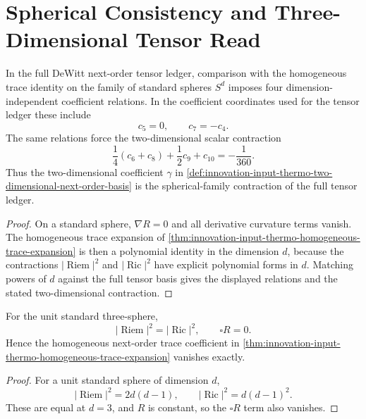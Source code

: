 \section{Spherical Consistency and Three-Dimensional Tensor Read}
\label{sec:innovation-input-thermo-verification-three-dimensional-tensor-coefficient}

\begin{theorem}
\label{thm:innovation-input-thermo-spherical-family-consistency}
In the full DeWitt next-order tensor ledger, comparison with the
homogeneous trace identity on the family of standard spheres $S^d$ imposes
four dimension-independent coefficient relations. In the coefficient
coordinates used for the tensor ledger these include
$$
c_5=0,
\qquad
c_7=-c_4.
$$
The same relations force the two-dimensional scalar contraction
$$
\frac14(c_6+c_8)+\frac12c_9+c_{10}
=
-\frac1{360}.
$$
Thus the two-dimensional coefficient $\gamma$ in
\autoref{def:innovation-input-thermo-two-dimensional-next-order-basis} is
the spherical-family contraction of the full tensor ledger.
\end{theorem}

\begin{proof}
On a standard sphere, $\nabla R=0$ and all derivative curvature terms vanish.
The homogeneous trace expansion of
\autoref{thm:innovation-input-thermo-homogeneous-trace-expansion} is then
a polynomial identity in the dimension $d$, because the contractions
$|\operatorname{Riem}|^2$ and $|\operatorname{Ric}|^2$ have explicit
polynomial forms in $d$. Matching powers of $d$ against the full tensor
basis gives the displayed relations and the stated two-dimensional
contraction.
\end{proof}

\begin{theorem}
\label{thm:innovation-input-thermo-three-sphere-zero-channel}
For the unit standard three-sphere,
$$
|\operatorname{Riem}|^2=|\operatorname{Ric}|^2,
\qquad
\square R=0.
$$
Hence the homogeneous next-order trace coefficient in
\autoref{thm:innovation-input-thermo-homogeneous-trace-expansion}
vanishes exactly.
\end{theorem}

\begin{proof}
For a unit standard sphere of dimension $d$,
$$
|\operatorname{Riem}|^2=2d(d-1),
\qquad
|\operatorname{Ric}|^2=d(d-1)^2.
$$
These are equal at $d=3$, and $R$ is constant, so the $\square R$ term
also vanishes.
\end{proof}

